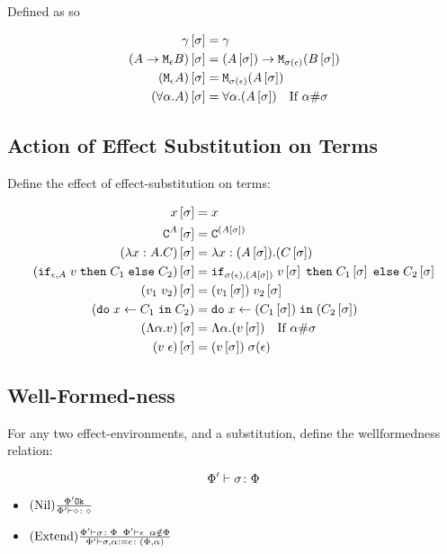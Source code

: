\documentclass{report}
\begin{document}
 Defined as so

 \begin{align}
     \g\sub{\si} &= \g \\
     (\lamtype{A}{\e}{B})\sub{\si} &= \lamtype{(A\sub{\si})}{\si(\e)}{(B\sub{\si})} \\
     (\M{\e}{A})\ssi &= \M{\si(\e)}{(A\ssi)}\\
     (\all{\a}{A})\ssi &= \all{\a}{(A\ssi)}\qt{If $\a\#\si$}
 \end{align}


\subsection{Action of Effect Substitution on Terms}

Define the effect of effect-substitution on terms:

\begin{align}
    x\ssi & = x \\
    \const{A}\ssi & = \const{(A\ssi)} \\
    (\lam{x}{A}{C})\ssi &= \lam{x}{(A\ssi)}{(C\ssi)}\\
    (\ifthenelse{\e}{A}{v}{C_1}{C_2})\ssi &= \ifthenelse{\si(\e)}{(A\ssi)}{v\ssi}{C_1\ssi}{C_2\ssi}\\
    (\apply{v_1}{v_2})\ssi&= \apply{(v_1\ssi)}{v_2\ssi}\\
    (\doin{x}{C_1}{C_2})&= \doin{x}{(C_1\ssi)}{(C_2\ssi)}\\
    (\elam{\a}{v})\ssi & = \elam{\a}{(v\ssi)}\qt{If $\a\#\si$}\\
    (\eapp{v}{\e})\ssi & = \eapp{(v\ssi)}{\si(\e)}\\
\end{align}

\subsection{Well-Formed-ness }

For any two effect-environments, and a substitution, define the wellformedness relation:

\begin{equation}
    \typerelation{\P'}{\si}{\P}
\end{equation}

\begin{itemize}
    \item $\treerule{Nil}{\ok{\P'}}{\typerelation{\P'}{\nil}{\nil}}$
    \item $\treerule{Extend}{\typerelation{\P'}{\si}{\P}\s\s\wellformed{\P'}{\e}\s\s\a\notin\P}{\typerelation{\P'}{\si, \a \setto\e}{(\P, \a)}}$
\end{itemize}
\end{document}
